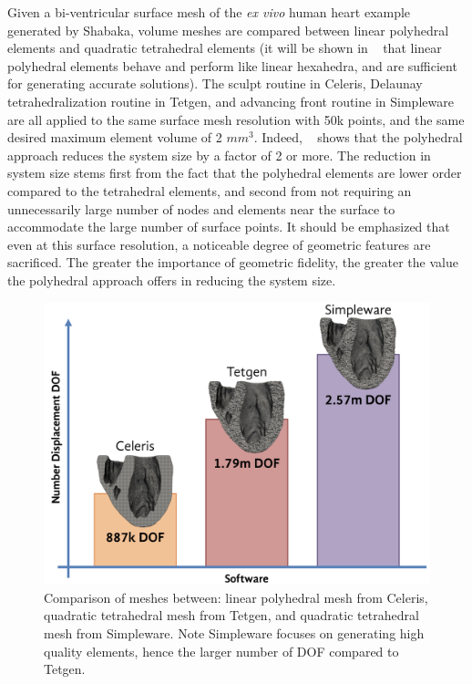 Given a bi-ventricular surface mesh of the \textit{ex vivo} human heart example generated by Shabaka, volume meshes are compared between linear polyhedral elements and quadratic tetrahedral elements (it will be shown in ~ that linear polyhedral elements behave and perform like linear hexahedra, and are sufficient for generating accurate solutions). The sculpt routine in Celeris, Delaunay tetrahedralization routine in Tetgen, and advancing front routine in Simpleware are all applied to the same surface mesh resolution with 50k points, and the same desired maximum element volume of 2 $mm^3$. Indeed, ~ shows that the polyhedral approach reduces the system size by a factor of 2 or more. The reduction in system size stems first from the fact that the polyhedral elements are lower order compared to the tetrahedral elements, and second from not requiring an unnecessarily large number of nodes and elements near the surface to accommodate the large number of surface points. It should be emphasized that even at this surface resolution, a noticeable degree of geometric features are sacrificed. The greater the importance of geometric fidelity, the greater the value the polyhedral approach offers in reducing the system size.

\begin{figure}[ht!]
\centering
		\includegraphics[scale=0.2]{media/comparison.png}
%
\caption{Comparison of meshes between: linear polyhedral mesh from Celeris, quadratic tetrahedral mesh from Tetgen, and quadratic tetrahedral mesh from Simpleware. Note Simpleware focuses on generating high quality elements, hence the larger number of DOF compared to Tetgen.}
\label{fig:compdof}
\end{figure}

